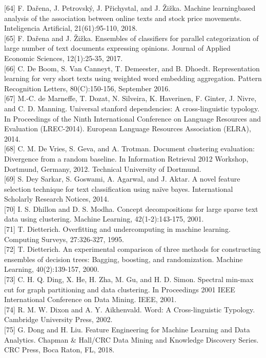 \documentclass[10pt]{book}
\begin{document}
[64] F. Dařena, J. Petrovský, J. Přichystal, and J. Žižka. Machine learningbased analysis of the association between online texts and stock price movements. Inteligencia Artificial, 21(61):95-110, 2018.\\[0pt]
[65] F. Dařena and J. Žižka. Ensembles of classifiers for parallel categorization of large number of text documents expressing opinions. Journal of Applied Economic Sciences, 12(1):25-35, 2017.\\[0pt]
[66] C. De Boom, S. Van Canneyt, T. Demeester, and B. Dhoedt. Representation learning for very short texts using weighted word embedding aggregation. Pattern Recognition Letters, 80(C):150-156, September 2016.\\[0pt]
[67] M.-C. de Marneffe, T. Dozat, N. Silveira, K. Haverinen, F. Ginter, J. Nivre, and C. D. Manning. Universal stanford dependencies: A cross-linguistic typology. In Proceedings of the Ninth International Conference on Language Resources and Evaluation (LREC-2014). European Language Resources Association (ELRA), 2014.\\[0pt]
[68] C. M. De Vries, S. Geva, and A. Trotman. Document clustering evaluation: Divergence from a random baseline. In Information Retrieval 2012 Workshop, Dortmund, Germany, 2012. Technical University of Dortmund.\\[0pt]
[69] S. Dey Sarkar, S. Goswami, A. Agarwal, and J. Aktar. A novel feature selection technique for text classification using naïve bayes. International Scholarly Research Notices, 2014.\\[0pt]
[70] I. S. Dhillon and D. S. Modha. Concept decompositions for large sparse text data using clustering. Machine Learning, 42(1-2):143-175, 2001.\\[0pt]
[71] T. Dietterich. Overfitting and undercomputing in machine learning. Computing Surveys, 27:326-327, 1995.\\[0pt]
[72] T. Dietterich. An experimental comparison of three methods for constructing ensembles of decision trees: Bagging, boosting, and randomization. Machine Learning, 40(2):139-157, 2000.\\[0pt]
[73] C. H. Q. Ding, X. He, H. Zha, M. Gu, and H. D. Simon. Spectral min-max cut for graph partitioning and data clustering. In Proceedings 2001 IEEE International Conference on Data Mining. IEEE, 2001.\\[0pt]
[74] R. M. W. Dixon and A. Y. Aikhenvald. Word: A Cross-linguistic Typology. Cambridge University Press, 2002.\\[0pt]
[75] G. Dong and H. Liu. Feature Engineering for Machine Learning and Data Analytics. Chapman \& Hall/CRC Data Mining and Knowledge Discovery Series. CRC Press, Boca Raton, FL, 2018.\\[0pt]
\end{document}

